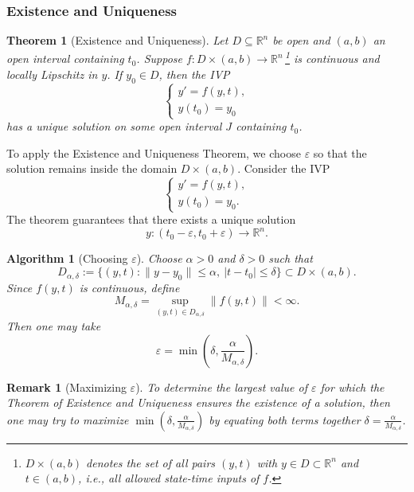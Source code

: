 \documentclass{article}
\newtheorem{theorem}{Theorem}
\newtheorem{remark}{Remark}
\newtheorem{algorithm}{Algorithm}
\newcommand{\R}{\mathbb{R}}
\begin{document}
\subsubsection{Existence and Uniqueness}
\label{EUT}
\begin{theorem}[Existence and Uniqueness]
    Let $D \subseteq \R^n$ be open and $(a,b)$ an open interval containing $t_0$. Suppose $f : D \times (a,b) \to \R^n$\,\footnote{\(D \times (a,b)\) denotes the set of all pairs \((y,t)\) with \(y \in D \subset \R^n\) and \(t \in (a,b)\), i.e., all allowed state-time inputs of \(f\).} is continuous and locally Lipschitz in $y$. If $y_0 \in D$, then the IVP
    \[\begin{cases}y' = f(y,t),\\y(t_0) = y_0\end{cases}\]
    has a unique solution on some open interval $J$ containing $t_0$.
\end{theorem}
To apply the Existence and Uniqueness Theorem, we choose \(\varepsilon\) so that the solution remains inside the domain \(D \times (a,b)\). Consider the IVP
\[\begin{cases}y' = f(y,t), \\ y(t_0) = y_0.\end{cases}\]
The theorem guarantees that there exists a unique solution 
\[y : (t_0-\varepsilon, t_0+\varepsilon) \to \R^n.\]
\begin{algorithm}[Choosing $\varepsilon$]
    Choose \(\alpha > 0\) and \(\delta > 0\) such that
    \[D_{\alpha,\delta} := \{(y,t) : \|y-y_0\| \le \alpha,\ |t-t_0| \le \delta\} \subset D \times (a,b).\]
    Since \(f(y,t)\) is continuous, define
    \[M_{\alpha,\delta} = \sup_{(y,t)\in D_{\alpha,\delta}} \|f(y,t)\| < \infty.\]
    Then one may take
    \[\varepsilon = \min\!\left(\delta, \frac{\alpha}{M_{\alpha,\delta}}\right).\]
\end{algorithm}
\begin{remark}[Maximizing $\varepsilon$]
    To determine the largest value of $\varepsilon$  for which the Theorem of Existence and Uniqueness ensures the existence of a solution, then one may try to maximize $\min\!\left(\delta, \frac{\alpha}{M_{\alpha,\delta}}\right)$ by equating both terms together $\delta = \frac{\alpha}{M_{\alpha,\delta}}$.
\end{remark}
\end{document}
